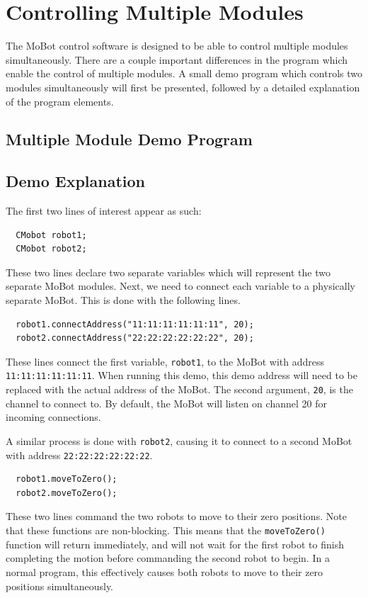 \documentclass{article}
\begin{document}
\section{Controlling Multiple Modules}
The MoBot control software is designed to be able to control multiple modules
simultaneously. There are a couple important differences in the program 
which enable the control of multiple modules. A small demo program which
controls two modules simultaneously will first be presented, followed by
a detailed explanation of the program elements.

\subsection{Multiple Module Demo Program}


\subsection{Demo Explanation}
The first two lines of interest appear as such:
\begin{verbatim}
  CMobot robot1;
  CMobot robot2;
\end{verbatim}
These two lines declare two separate variables which will represent the
two separate MoBot modules. Next, we need to connect each variable to
a physically separate MoBot. This is done with the following lines.
\begin{verbatim}
  robot1.connectAddress("11:11:11:11:11:11", 20);
  robot2.connectAddress("22:22:22:22:22:22", 20);
\end{verbatim}
These lines connect the first variable, \texttt{robot1}, to the MoBot with
address \texttt{11:11:11:11:11:11}. When running this demo, this
demo address will need to be replaced with the actual address of the MoBot.
The second argument, \texttt{20}, is the channel to connect to. By default,
the MoBot will listen on channel 20 for incoming connections.

A similar process is done with \texttt{robot2}, causing it to connect
to a second MoBot with address \texttt{22:22:22:22:22:22}.

\begin{verbatim}
  robot1.moveToZero();
  robot2.moveToZero();
\end{verbatim}
These two lines command the two robots to move to their zero positions.
Note that these functions are non-blocking. This means that the
\texttt{moveToZero()} function will return immediately, and will not
wait for the first robot to finish completing the motion before 
commanding the second robot to begin. In a normal program, this effectively
causes both robots to move to their zero positions simultaneously.
\end{document}
